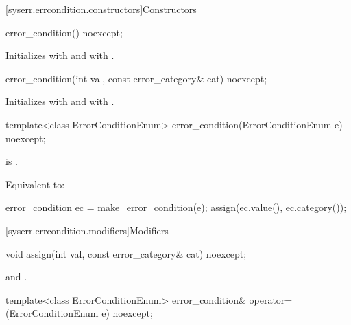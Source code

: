 [syserr.errcondition.constructors]{Constructors}

%
\begin{itemdecl}
error_condition() noexcept;
\end{itemdecl}

\begin{itemdescr}
\pnum
\effects
Initializes  with 
and  with .
\end{itemdescr}

%
\begin{itemdecl}
error_condition(int val, const error_category& cat) noexcept;
\end{itemdecl}

\begin{itemdescr}
\pnum
\effects
Initializes  with 
and  with .
\end{itemdescr}

%
\begin{itemdecl}
template<class ErrorConditionEnum>
  error_condition(ErrorConditionEnum e) noexcept;
\end{itemdecl}

\begin{itemdescr}
\pnum
\constraints
{} is .

\pnum
\effects
Equivalent to:
\begin{codeblock}
error_condition ec = make_error_condition(e);
assign(ec.value(), ec.category());
\end{codeblock}
\end{itemdescr}


[syserr.errcondition.modifiers]{Modifiers}

%
\begin{itemdecl}
void assign(int val, const error_category& cat) noexcept;
\end{itemdecl}

\begin{itemdescr}
\pnum
\ensures
{} and .
\end{itemdescr}

%
\begin{itemdecl}
template<class ErrorConditionEnum>
  error_condition& operator=(ErrorConditionEnum e) noexcept;
\end{itemdecl}

